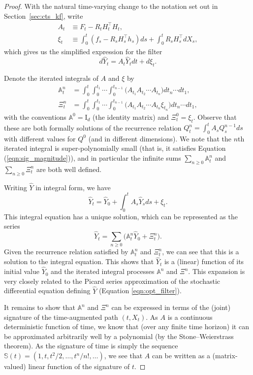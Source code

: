 \documentclass[10pt,a4paper]{amsart}
\theoremstyle{plain}
\theoremstyle{remark}
\begin{document}
\begin{proof} With the natural time-varying change to the notation set out in Section~\ref{sec:cts_kf}, write
\begin{align}
A_t &\equiv F_t -R_t H_t^\top H_t,\nonumber\\
\xi_t &\equiv  \int_0^t (f_s - R_s H_s^\top h_s) ds + \int_0^t R_sH_s^\top dX_s, \label{eqn:xi}
 \end{align}
which gives us the simplified expression for the filter
\begin{equation}\label{eq:simplifiedXhat} d\hat Y_t = A_t \hat Y_tdt + d\xi_t.\end{equation}

Denote the iterated integrals of $A$ and $\xi$ by
\begin{align*}
    \mathbb{A}^n_t &= \int_0^t\int_0^{t_1}\cdots\int_0^{t_{n-1}}\Big(A_{t_1}A_{t_2}\cdots A_{t_n}\Big)dt_{n}\cdots dt_1,\\
    \Xi^n_t &= \int_0^t\int_0^{t_1}\cdots\int_0^{t_{n-1}}\Big(A_{t_1}A_{t_2}\cdots A_{t_n}\xi_{t_n}\Big) dt_{n}\cdots dt_1,
\end{align*}
with the conventions $\mathbb{A}^0 =\mathrm{I}_d$ (the identity matrix) and $\Xi^0_t = \xi_t$. Observe that these are both formally solutions of the recurrence relation $Q^n_t = \int_0^t A_s Q^{n-1}_s ds$ with different values for $Q^0$ (and in different dimensions). We note that the $n$th iterated integral is super-polynomially small (that is, it satisfies Equation (\ref{eqn:sig_magnitude})), and in particular the infinite sums $\sum_{n\ge 0} \mathbb{A}^n_t$ and $\sum_{n\ge 0} \Xi^n_t$ are both well defined.


Writing $\hat Y$ in integral form, we have
\[\hat Y_t = \hat Y_0 +\int_0^t A_s \hat Y_s ds + \xi_t.\]
This integral equation has a unique solution, which can be represented as the series
\[\hat Y_t = \sum_{n\ge 0} \Big(\mathbb{A}^n_t \hat Y_0 + \Xi^n_t\Big).\]
Given the recurrence relation satisfied by $\mathbb{A}^n_t$ and $\Xi^n_t$, we can see that this is a solution to the integral equation.
This shows that $\hat Y_t$ is a (linear) function of its initial value $\hat Y_0$ and the iterated integral processes $\mathbb{A}^n$ and $\Xi^n$. This expansion is very closely related to the Picard series approximation of the stochastic differential equation defining $\hat Y$ (Equation \eqref{eqn:opt_filter}). 

It remains to show that $\mathbb{A}^n$ and $\Xi^n$ can be expressed in terms of the (joint) signature of the time-augmented path $(t, X_t)$. As $A$ is a continuous deterministic function of time, we know that (over any finite time horizon) it can be approximated arbitrarily well by a polynomial (by the Stone--Weierstrass theorem). As the signature of time is simply the sequence $\mathbb{S}(t)= (1, t, t^2/2, \dots, t^n/n!,\dots)$, we see that $A$ can be written as a (matrix-valued) linear function of the signature of $t$.


\end{proof}
\end{document}
